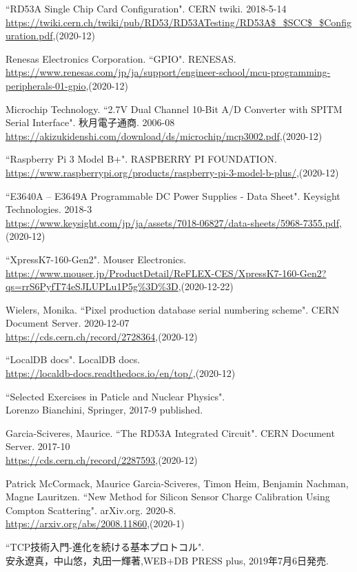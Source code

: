 \begin{thebibliography}{9}
``RD53A Single Chip Card Configuration". CERN twiki. 2018-5-14 \\
\url{https://twiki.cern.ch/twiki/pub/RD53/RD53ATesting/RD53A$\_$SCC$\_$Configuration.pdf},(2020-12)

Renesas Electronics Corporation. ``GPIO". RENESAS.  \\
\url{https://www.renesas.com/jp/ja/support/engineer-school/mcu-programming-peripherals-01-gpio},(2020-12)

Microchip Technology. ``2.7V Dual Channel 10-Bit A/D Converter with SPITM Serial Interface". 秋月電子通商. 2006-08\\
\url{https://akizukidenshi.com/download/ds/microchip/mcp3002.pdf},(2020-12)

``Raspberry Pi 3 Model B+". RASPBERRY PI FOUNDATION. \\
\url{https://www.raspberrypi.org/products/raspberry-pi-3-model-b-plus/},(2020-12)

``E3640A – E3649A Programmable DC Power Supplies - Data Sheet". Keysight Technologies. 2018-3\\
\url{https://www.keysight.com/jp/ja/assets/7018-06827/data-sheets/5968-7355.pdf},(2020-12)

``XpressK7-160-Gen2". Mouser Electronics.\\
\url{https://www.mouser.jp/ProductDetail/ReFLEX-CES/XpressK7-160-Gen2?qs=rrS6PyfT74eSJLUPLu1P5g\%3D\%3D},(2020-12-22)

Wielers, Monika. ``Pixel production database serial numbering scheme". CERN Document Server. 2020-12-07\\
\url{https://cds.cern.ch/record/2728364},(2020-12)

``LocalDB docs". LocalDB docs. \\
\url{https://localdb-docs.readthedocs.io/en/top/},(2020-12)

``Selected Exercises in Paticle and Nuclear Physics".\\
Lorenzo Bianchini, Springer, 2017-9 published.

Garcia-Sciveres, Maurice. ``The RD53A Integrated Circuit". CERN Document Server. 2017-10\\
\url{https://cds.cern.ch/record/2287593},(2020-12)

Patrick McCormack, Maurice Garcia-Sciveres, Timon Heim, Benjamin Nachman, Magne Lauritzen. ``New Method for Silicon Sensor Charge Calibration Using Compton Scattering". arXiv.org. 2020-8.\\
\url{https://arxiv.org/abs/2008.11860},(2020-1)

``TCP技術入門-進化を続ける基本プロトコル".\\
安永遼真，中山悠，丸田一輝著,WEB+DB PRESS plus, 2019年7月6日発売.

\end{thebibliography}
